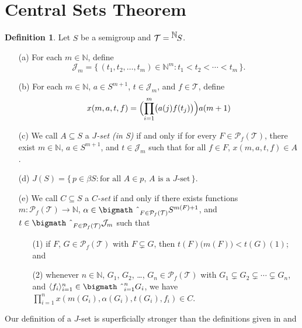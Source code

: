 \documentclass[12pt]{article}
\theoremstyle{plain}
\theoremstyle{definition}
\newtheorem{defn}[thm]{Definition}
\newcommand{\la}{\langle}
\newcommand{\ra}{\rangle}
\newcommand{\bbN}{\mathbb{N}}
\newcommand{\calJ}{\mathcal{J}}
\newcommand{\calT}{\mathcal{T}}
\newcommand{\Pf}{\mathcal{P}_f}
\newcommand{\setfunc}[2]{\hbox{${}^{\hbox{$#1$}}\hskip -1 pt #2$}}
\newcommand{\bigtimes}{\hbox{\bigmath \char'2}}
\begin{document}
\section{Central Sets Theorem}
\begin{defn}
  Let $S$ be a semigroup and $\calT = \setfunc{\bbN}{S}$.
  \begin{itemize}
    \item[(a)] For each $m \in \bbN$, define
      \[
        \calJ_m = \{\, (t_1, t_2, \ldots, t_m) \in \bbN^m : t_1 < t_2
        < \cdots < t_m \,\}.
      \]

    \item[(b)] For each $m \in \bbN$, $a \in S^{m+1}$, $t \in
      \calJ_m$, and $f \in \calT$, define
      \[
        x(m, a, t, f) = \Bigl(\prod_{i=1}^m\bigl( a(j) f(t_j) \bigr)\Bigr) a(m+1)
      \]

    \item[(c)] We call $A \subseteq S$ a \textsl{$J$-set (in S)} if
      and only if for every $F \in \Pf(\calT)$, there exist $m \in
      \bbN$, $a \in S^{m+1}$, and $t \in \calJ_m$ such that for all $f
      \in F$, $x(m, a, t, f) \in A$.

    \item[(d)] $J(S) = \{\, p \in \beta S : \mbox{for all $A \in p$,
        $A$ is a $J$-set} \,\}$.

    \item[(e)] We call $C \subseteq S$ a \textsl{$C$-set} if and only
      if there exists functions $m \colon \Pf(\calT) \to \bbN$,
      $\alpha \in \bigtimes_{F \in \Pf(\calT)} S^{m(F) + 1}$, and $t
      \in \bigtimes_{F \in \Pf(\calT)} \calJ_m$ such that
      \begin{itemize}
        \item[(1)] if $F$, $G \in \Pf(\calT)$ with $F \subsetneq G$,
          then $t(F)\bigl( m(F) \bigr) < t(G)(1)$; and
        
        \item[(2)] whenever $n \in \bbN$, $G_1$, $G_2$, \ldots, $G_n
          \in \Pf(\calT)$ with $G_1 \subsetneq G_2 \subsetneq \cdots
          \subsetneq G_n$, and $\la f_i \ra_{i=1}^n \in
          \bigtimes_{i=1}^n G_i$, we have
          $\prod_{i=1}^n x(m(G_i), \alpha(G_i), t(G_i), f_i) \in C$. 
      \end{itemize}
  \end{itemize}
\end{defn}
Our definition of a $J$-set is superficially stronger than the
definitions given in \cite[Definition 2.3(d)]{Hindman:2010fk} and
\end{document}
